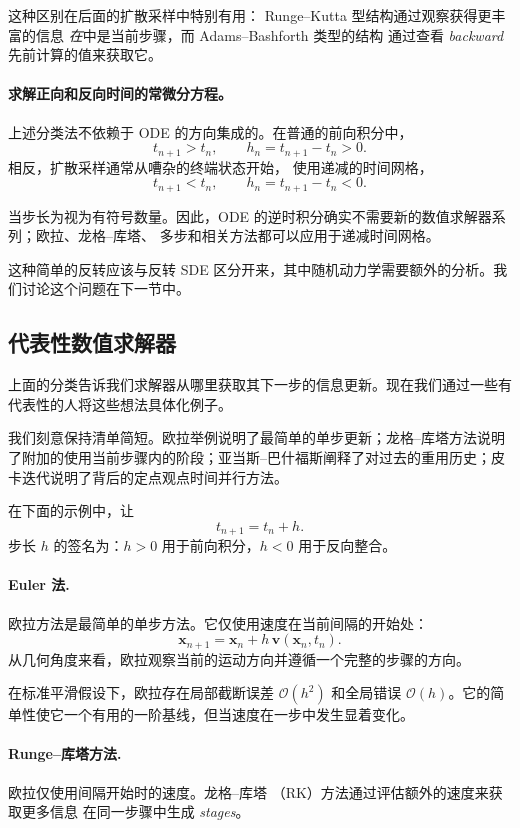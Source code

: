 这种区别在后面的扩散采样中特别有用：
Runge--Kutta 型结构通过观察获得更丰富的信息
\emph{在}中是当前步骤，而 Adams--Bashforth 类型的结构
通过查看 \emph{backward} 先前计算的值来获取它。

\paragraph{求解正向和反向时间的常微分方程。}
上述分类法不依赖于 ODE 的方向集成的。在普通的前向积分中，
\[
t_{n+1}>t_n,
\qquad
h_n=t_{n+1}-t_n>0.
\]
相反，扩散采样通常从嘈杂的终端状态开始，
使用递减的时间网格，
\[
t_{n+1}<t_n,
\qquad
h_n=t_{n+1}-t_n<0.
\]

当步长为视为有符号数量。因此，ODE 的逆时积分确实不需要新的数值求解器系列；欧拉、龙格--库塔、
多步和相关方法都可以应用于递减时间网格。

这种简单的反转应该与反转 SDE 区分开来，其中随机动力学需要额外的分析。我们讨论这个问题在下一节中。


\subsection{代表性数值求解器}
\label{app:de-solver-examples}

上面的分类告诉我们求解器从哪里获取其下一步的信息更新。现在我们通过一些有代表性的人将这些想法具体化例子。

我们刻意保持清单简短。欧拉举例说明了最简单的单步更新；龙格--库塔方法说明了附加的使用当前步骤内的阶段；亚当斯--巴什福斯阐释了对过去的重用历史；皮卡迭代说明了背后的定点观点时间并行方法。

在下面的示例中，让
\[
t_{n+1}=t_n+h.
\]
步长 $h$ 的签名为：$h>0$ 用于前向积分，$h<0$ 用于反向整合。


\paragraph{Euler 法.}
欧拉方法是最简单的单步方法。它仅使用速度在当前间隔的开始处：
\[
\mathbf{x}_{n+1}
=
\mathbf{x}_n
+
h\,\mathbf{v}(\mathbf{x}_n,t_n).
\]
从几何角度来看，欧拉观察当前的运动方向并遵循一个完整的步骤的方向。

在标准平滑假设下，欧拉存在局部截断误差
$\mathcal O(h^2)$ 和全局错误 $\mathcal O(h)$。它的简单性使它一个有用的一阶基线，但当速度在一步中发生显着变化。\paragraph{Runge--库塔方法.}
欧拉仅使用间隔开始时的速度。龙格--库塔
（RK）方法通过评估额外的速度来获取更多信息
在同一步骤中生成 \emph{stages}。

